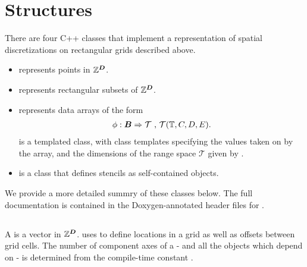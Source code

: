 \documentclass[12pt]{article}
\begin{document}
\section{\libname Structures}

There are four C++ classes that implement a representation of spatial discretizations on rectangular grids described above.
\begin{itemize}
\item
{} represents points in $\mathbb{Z}^{\boldsymbol{D}}$.
\item
{} represents rectangular subsets of $\mathbb{Z}^{\boldsymbol{D}}$.
\item
{} represents data arrays of the form
\begin{gather*}
\phi:{\boldsymbol{B}} \Rightarrow \mathcal{T} \hbox{ , } \mathcal{T}(\mathbb{T},C,D,E).
\end{gather*}
 is a templated class, with class templates specifying the values taken on by the array, and the dimensions of the range space $\mathcal{T}$ given by . 
\item
{} is a class that defines stencils as self-contained objects.
\end{itemize}
We provide a more detailed summry of these classes below. The full documentation is contained in the Doxygen-annotated header files for \libname.
\subsection{}

A  is a vector in $\mathbb{Z}^{\boldsymbol{D}}$. \libname uses  to define locations in a grid as well as offsets between grid cells. The number of component axes of a  - and all the objects which depend on  - is determined from the compile-time constant . 
\end{document}
